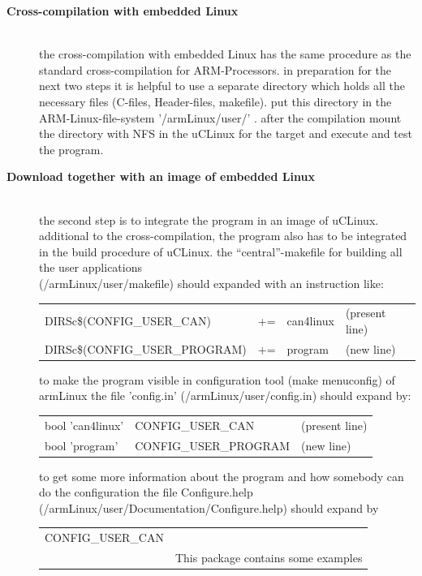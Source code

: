 \begin{description}
\item[{\rot\bf Cross-compilation with embedded Linux}]~\\
\bi
	\ite the cross-compilation with embedded Linux has the same procedure as the standard cross-compilation for ARM-Processors.
	\ite in preparation for the next two steps it is helpful to use a separate directory which holds all the necessary files (C-files, Header-files, makefile).
	\ite put this directory in the ARM-Linux-file-system '/armLinux/user/' .
	\ite after the compilation mount the directory with NFS in the uCLinux for the target and execute and test the program.
\ei
\bigskip
\item[{\rot\bf Download together with an image of  embedded Linux}]~\\
\bi
	\ite the second step is to integrate the program in an image of uCLinux.
	\ite additional to the cross-compilation, the program also has to be integrated in the build procedure of uCLinux.
	\bi
		\ite the ``central''-makefile for building all the user applications \\ (/armLinux/user/makefile) should expanded with an instruction like:
		\\ \begin{tabular}{l l l l}
		    DIRSc\$(CONFIG\_USER\_CAN)& += & can4linux & (present line)\\
		    DIRSc\$(CONFIG\_USER\_PROGRAM)& += & program & (new line)\\
		   \end{tabular}
		\ite to make the program visible in configuration tool (make menuconfig) of armLinux the file 'config.in' (/armLinux/user/config.in) should expand by:
		\\ \begin{tabular}{l l l}
		    bool 'can4linux' & CONFIG\_USER\_CAN & (present line) \\
		    bool 'program' & CONFIG\_USER\_PROGRAM & (new line) \\
		   \end{tabular}
		\ite to get some more information about the program and how somebody can do the configuration the file Configure.help \\
		(/armLinux/user/Documentation/Configure.help) should expand by
		\\ \begin{tabular}{l l}
		   CONFIG\_USER\_CAN& \\
		    & This package contains some examples\\

\end{tabular}
\end{description}
